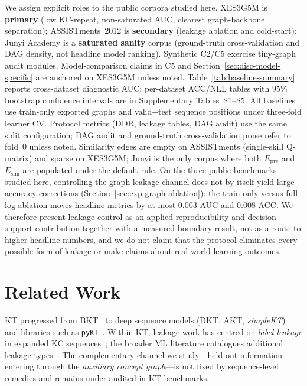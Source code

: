 \documentclass[pdflatex,sn-mathphys-num]{sn-jnl}
\newcommand{\Epre}{\ensuremath{E_{\text{pre}}}}
\newcommand{\Esim}{\ensuremath{E_{\text{sim}}}}
\newcommand{\DDR}{\textsc{DDR}}
\begin{document}
We assign explicit roles to the public corpora studied here.
XES3G5M is \textbf{primary} (low KC-repeat, non-saturated AUC, clearest
graph-backbone separation); ASSISTments~2012 is \textbf{secondary}
(leakage ablation and cold-start); Junyi Academy is a \textbf{saturated
sanity} corpus (ground-truth cross-validation and DAG density, not headline
model ranking). Synthetic C2/C5 exercise tiny-graph audit modules.
Model-comparison claims in C5 and Section~\ref{sec:disc-model-specific}
are anchored on XES3G5M unless noted. Table~\ref{tab:baseline-summary}
reports cross-dataset diagnostic AUC; per-dataset ACC/NLL tables with 95\%
bootstrap confidence intervals are in Supplementary Tables~S1--S5. All
baselines use train-only exported graphs and valid+test sequence positions
under three-fold learner CV. Protocol metrics (\DDR{}, leakage tables, DAG
audit) use the same split configuration; DAG audit and ground-truth
cross-validation prose refer to fold~0 unless noted. Similarity edges are
empty on ASSISTments (single-skill Q-matrix) and sparse on XES3G5M; Junyi
is the only corpus where both $\Epre$ and $\Esim$ are populated under the
default rule. On the three public benchmarks studied here,
controlling the graph-leakage channel does not by itself yield large
accuracy corrections (Section~\ref{sec:exp-graph-ablation}): the train-only
versus full-log ablation moves headline metrics by at most $0.003$ AUC
and $0.008$ ACC.
We therefore present leakage control as an applied reproducibility and
decision-support contribution together with a measured boundary result, not
as a route to higher headline numbers, and we do not claim that the
protocol eliminates every possible form of leakage or make claims about
real-world learning outcomes.
\section{Related Work}
\label{sec:related}
KT progressed from BKT~\cite{corbett1995bkt} to deep sequence models
(DKT, AKT, \textit{simpleKT})~\cite{piech2015dkt,ghosh2020akt,liu2023simplekt}
and libraries such as \texttt{pyKT}~\cite{liu2022pykt,abdelrahman2023kt_survey}.
Within KT, leakage work has centred on \emph{label leakage} in expanded KC
sequences~\cite{liu2022pykt,badran2024labelleakage}; the broader ML literature
catalogues additional leakage types~\cite{kaufman2012leakage,kapoor2023leakage}.
The complementary channel we study---held-out information entering through the
\emph{auxiliary concept graph}---is not fixed by sequence-level remedies and
remains under-audited in KT benchmarks.
\end{document}
